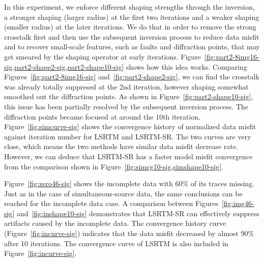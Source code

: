 In this experiment, we enforce different shaping strengths through the inversion, 
a stronger shaping (larger radius) at the first two iterations and a weaker shaping (smaller radius) at the later iterations.
We do that in order to remove the strong crosstalk first and then use the subsequent inversion process to 
reduce data misfit and to recover
small-scale features, such as faults and diffraction points, that may get smeared by the shaping operator at early iterations.
Figure~\ref{fig:part2-8img16-sig,part2-shape2-sig,part2-shape10-sig} shows how this idea works.
Comparing Figures~\ref{fig:part2-8img16-sig} and~\ref{fig:part2-shape2-sig}, 
we can find the crosstalk was already totally suppresed at the 2nd iteration, 
however shaping somewhat smoothed out the diffraction points.
As shown in Figure~\ref{fig:part2-shape10-sig}, this issue has been partially resolved by the subsequent inversion process.
The diffraction points became focused at around the 10th iteration.
Figure~\ref{fig:simcurve-sig} shows the convergence history of normalized data misfit against iteration number for LSRTM and LSRTM-SR.
The two curves are very close, which means the two methods have similar data misfit decrease rate.
However, we can deduce that LSRTM-SR has a faster model misfit convergence 
from the comparison shown in Figure~\ref{fig:simcg10-sig,simshape10-sig}.


Figure~\ref{fig:zero46-sig} shows the incomplete data with 60\% of its traces missing.
Just as in the case of simultaneous-source data, 
the same conclusions can be reached for the incomplete data case.
A comparison between Figures~\ref{fig:img46-sig} and~\ref{fig:inshape10-sig} demonstrates that LSRTM-SR can effectively
suppress artifacts caused by the incomplete data.
The convergence history curve (Figure~\ref{fig:incurve-sig}) indicates that the data misfit decreased by almost 90\% after 10 iterations.
The convergence curve of LSRTM is also included in Figure~\ref{fig:incurve-sig}.

